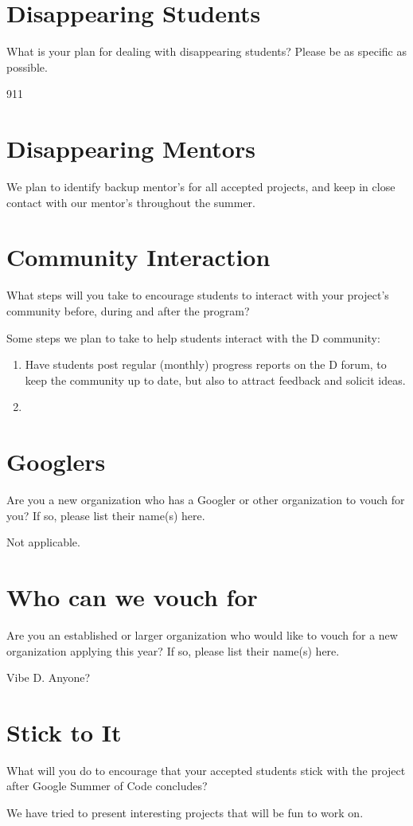 \documentclass[a4paper,12pt]{article}
\begin{document}
\section{Disappearing Students}
What is your plan for dealing with disappearing students? 
Please be as specific as possible.

911

\section{Disappearing Mentors}

We plan to identify backup mentor's for all accepted projects, 
and keep in close contact with our mentor's throughout the
summer.  

\section{Community Interaction}
What steps will you take to encourage students to interact 
with your project's community before, during and after 
the program?

Some steps we plan to take to help students interact with
the D community:

\begin{enumerate}
\item Have students post regular (monthly) progress reports
on the D forum, to keep the community up to date, but also
to attract feedback and solicit ideas.
\item 
\end{enumerate}

\section{Googlers}
Are you a new organization who has a Googler or other organization
to vouch for you? If so, please list their name(s) here.

Not applicable.

\section{Who can we vouch for}
Are you an established or larger organization who would like to 
vouch for a new organization applying this year? If so, please 
list their name(s) here.

Vibe D.   Anyone?

\section{Stick to It}
What will you do to encourage that your accepted students stick 
with the project after Google Summer of Code concludes?

We have tried to present interesting projects that will be fun
to work on.
\end{document}
